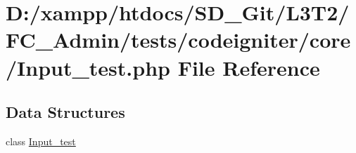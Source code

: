 \hypertarget{_input__test_8php}{}\section{D\+:/xampp/htdocs/\+S\+D\+\_\+\+Git/\+L3\+T2/\+F\+C\+\_\+\+Admin/tests/codeigniter/core/\+Input\+\_\+test.php File Reference}
\label{_input__test_8php}
\subsection*{Data Structures}
\begin{DoxyCompactItemize}
\item 
class \hyperlink{class_input__test}{Input\+\_\+test}
\end{DoxyCompactItemize}
